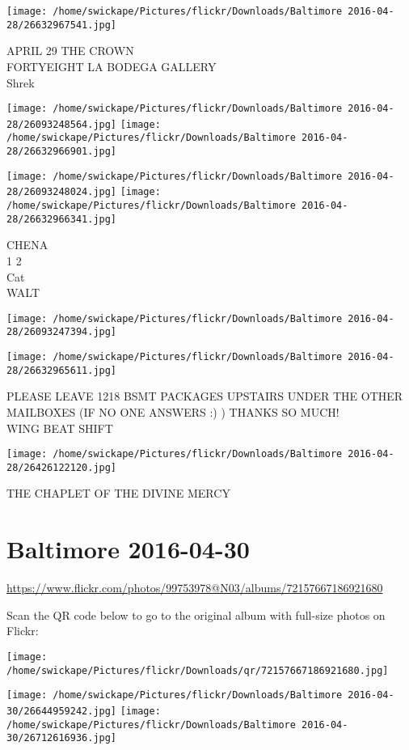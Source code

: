 \documentclass[10pt,letterpaper]{article}
\begin{document}
\vspace{0.25in}
\texttt{[image: /home/swickape/Pictures/flickr/Downloads/Baltimore 2016-04-28/26632967541.jpg]}

APRIL 29 THE CROWN\\
FORTYEIGHT LA BODEGA GALLERY\\
Shrek
\pagebreak

\texttt{[image: /home/swickape/Pictures/flickr/Downloads/Baltimore 2016-04-28/26093248564.jpg]}
\texttt{[image: /home/swickape/Pictures/flickr/Downloads/Baltimore 2016-04-28/26632966901.jpg]}

\texttt{[image: /home/swickape/Pictures/flickr/Downloads/Baltimore 2016-04-28/26093248024.jpg]}
\texttt{[image: /home/swickape/Pictures/flickr/Downloads/Baltimore 2016-04-28/26632966341.jpg]}

CHENA\\
1 2\\
Cat\\
WALT
\pagebreak

\texttt{[image: /home/swickape/Pictures/flickr/Downloads/Baltimore 2016-04-28/26093247394.jpg]}

\vspace{0.25in}
\texttt{[image: /home/swickape/Pictures/flickr/Downloads/Baltimore 2016-04-28/26632965611.jpg]}

PLEASE LEAVE 1218 BSMT PACKAGES UPSTAIRS UNDER THE OTHER MAILBOXES (IF NO ONE ANSWERS :) )  THANKS SO MUCH!\\
WING BEAT SHIFT
\pagebreak

\texttt{[image: /home/swickape/Pictures/flickr/Downloads/Baltimore 2016-04-28/26426122120.jpg]}

THE CHAPLET OF THE DIVINE MERCY
\pagebreak

\section*{Baltimore 2016-04-30}

\url{https://www.flickr.com/photos/99753978@N03/albums/72157667186921680}

Scan the QR code below to go to the original album with full-size photos on Flickr:

\texttt{[image: /home/swickape/Pictures/flickr/Downloads/qr/72157667186921680.jpg]}
\pagebreak

\texttt{[image: /home/swickape/Pictures/flickr/Downloads/Baltimore 2016-04-30/26644959242.jpg]}
\texttt{[image: /home/swickape/Pictures/flickr/Downloads/Baltimore 2016-04-30/26712616936.jpg]}
\end{document}
